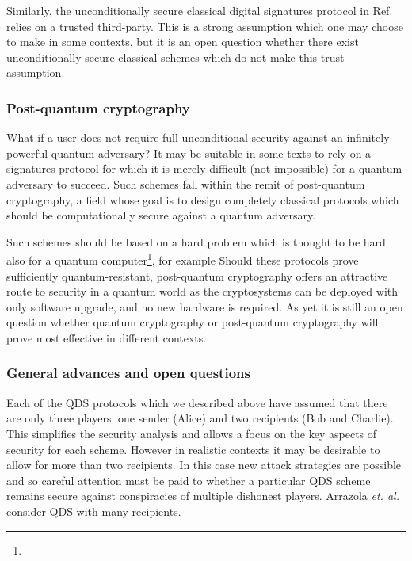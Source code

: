 Similarly, the unconditionally secure classical digital signatures protocol in Ref.~ relies on a trusted third-party. This is a strong assumption which one may choose to make in some contexts, but it is an open question whether there exist unconditionally secure classical schemes which do not make this trust assumption.

\subsubsection*{Post-quantum cryptography}
What if a user does not require full unconditional security against an infinitely powerful quantum adversary? It may be suitable in some texts to rely on a signatures protocol for which it is merely difficult (not impossible) for a quantum adversary to succeed. Such schemes fall within the remit of post-quantum cryptography, a field whose goal is to design completely classical protocols which should be computationally secure against a quantum adversary. 

Such schemes should be based on a hard problem which is thought to be hard also for a quantum computer\footnote{}, for example  Should these protocols prove sufficiently quantum-resistant, post-quantum cryptography offers an attractive route to security in a quantum world as the cryptosystems can be deployed with only software upgrade, and no new hardware is required.  As yet it is still an open question whether quantum cryptography or post-quantum cryptography will prove most effective in different contexts.

\subsubsection*{General advances and open questions}
Each of the QDS protocols which we described above have assumed that there are only three players: one sender (Alice) and two recipients (Bob and Charlie). This simplifies the security analysis and allows a focus on the key aspects of security for each scheme. However in realistic contexts it may be desirable to allow for more than two recipients. In this case new attack strategies are possible and so careful attention must be paid to whether a particular QDS scheme remains secure against conspiracies of multiple dishonest players. Arrazola \emph{et. al.} \cite{Arrazola2015} consider QDS with many recipients. 

